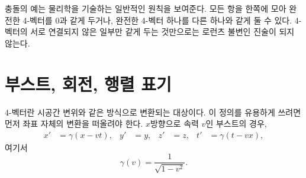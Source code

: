 충돌의 예는 물리학을 기술하는 일반적인 원칙을 보여준다. 모든 항을 한쪽에 모아 완전한 4-벡터를 0과 같게 두거나, 완전한 4-벡터 하나를 다른 하나와 같게 둘 수 있다. 4-벡터의 서로 연결되지 않은 일부만 같게 두는 것만으로는 로런츠 불변인 진술이 되지 않는다.

\section{부스트, 회전, 행렬 표기}

4-벡터란 시공간 변위와 같은 방식으로 변환되는 대상이다. 이 정의를 유용하게 쓰려면 먼저 좌표 자체의 변환을 떠올려야 한다. \(x\)방향으로 속력 \(v\)인 부스트의 경우, \begin{align}
  x'&=\gamma(x-vt), & y'&=y, & z'&=z,
  & t'&=\gamma(t-vx),                                      \label{eq:l6-boost}
\end{align} 여기서 \begin{equation}
  \gamma(v)=\frac{1}{\sqrt{1-v^2}}.
\end{equation}

\begin{classroomqa}\end{classroomqa}

